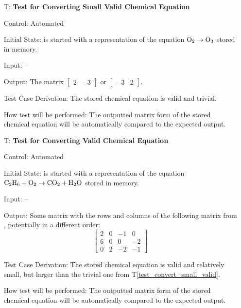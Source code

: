 \documentclass[12pt, titlepage]{article}
\newcounter{testnum} %
\newcommand{\testref}[1]{T\ref{#1}}
\begin{document}
\begin{enumerate}

  \item[T\refstepcounter{testnum}\thetestnum \label{test_convert_small_valid}:]
    \textbf{Test for Converting Small Valid Chemical Equation}

    Control: Automated

    Initial State: \progname{} is started with a representation of the equation
    $\ce{O2} \rightarrow \ce{O3}$ \cite{fahey_twenty_2011} stored in memory.

    Input: --

    Output: The matrix
    $\begin{bmatrix}
        2 & -3
      \end{bmatrix}$ or
    $\begin{bmatrix}
        -3 & 2
      \end{bmatrix}$.

    Test Case Derivation: The stored chemical equation is valid and trivial.

    How test will be performed: The outputted matrix form of the stored
    chemical equation will be automatically compared to the expected output.

  \item[T\refstepcounter{testnum}\thetestnum \label{test_convert_valid}:]
    \textbf{Test for Converting Valid Chemical Equation}

    Control: Automated

    Initial State: \progname{} is started with a representation of the equation
    $\ce{C2H6} + \ce{O2} \rightarrow \ce{CO2} + \ce{H2O}$
    \cite{hamid_balancing_2019} stored in memory.

    Input: --

    Output: Some matrix with the rows and columns of the following matrix from
    \cite{hamid_balancing_2019}, potentially in a different order:
    $$\begin{bmatrix}
        2 & 0 & -1 & 0  \\
        6 & 0 & 0  & -2 \\
        0 & 2 & -2 & -1
      \end{bmatrix}$$

    Test Case Derivation: The stored chemical equation is valid and relatively
    small, but larger than the trivial one from
    \testref{test_convert_small_valid}.

    How test will be performed: The outputted matrix form of the stored
    chemical equation will be automatically compared to the expected output.


\end{enumerate}
\end{document}
